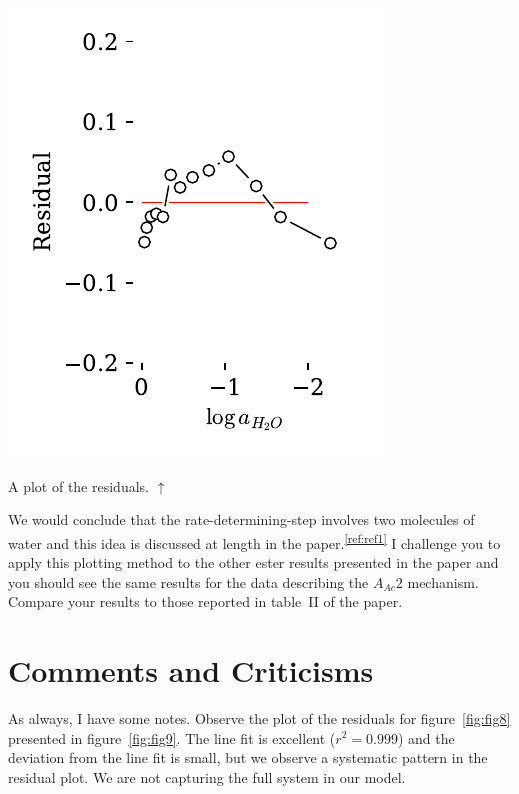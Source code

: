 \documentclass[]{tufte-handout}
\begin{document}
\begin{marginfigure}[-15mm]
  \centering
  \includegraphics[scale=0.7]{images/fig8r}
  \caption{A plot of the residuals. $\uparrow$} 
  \label{fig:fig9}
\end{marginfigure}

We would conclude that the rate-determining-step involves two molecules of water and this idea is discussed at length in the paper.\textsuperscript{\ref{ref:ref1}} I challenge you to apply this plotting method to the other ester results presented in the paper and you should see the same results for the data describing the $A_{Ac}2$ mechanism. Compare your results to those reported in table~II of the paper.
\newpage
\section{Comments and Criticisms}

As always, I have some notes. Observe the plot of the residuals for figure~\vref{fig:fig8} presented in figure~\ref{fig:fig9}. The line fit is excellent ($r^2 = 0.999$) and the deviation from the line fit is small, but we observe a systematic pattern in the residual plot. We are not capturing the full system in our model.
\end{document}
